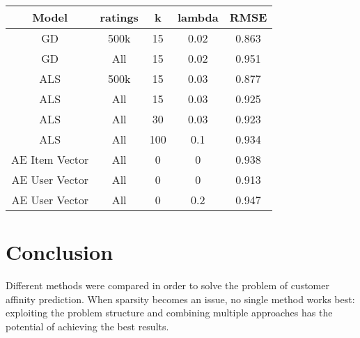 \documentclass[10pt,twocolumn]{article}
\begin{document}
\vspace{0.5cm}

\begin{center}
    \begin{tabular}{|c|c|c|c|c|}
       \hline
       Model & ratings & k & lambda  & RMSE \\
       \hline
       GD  & 500k & 15 & 0.02 & 0.863 \\
	   GD & All & 15 & 0.02 &  0.951 \\
       ALS & 500k & 15 & 0.03 & 0.877 \\
	   ALS & All &  15  &  0.03 & 0.925 \\
       ALS & All & 30 & 0.03 &  0.923 \\
   	   ALS & All &  100  &  0.1 &   0.934 \\
   	   AE Item Vector &  All & 0 & 0 & 0.938 \\
       AE User Vector &  All &  0  &  0 & 0.913 \\
	   AE User Vector &  All &  0  &  0.2 & 0.947 \\

       \hline
    \end{tabular}
  \end{center}




\section{Conclusion}

Different methods were compared in order to solve the problem of customer affinity prediction. When sparsity becomes an issue, no single method works best: exploiting the problem structure and combining multiple approaches has the potential of achieving the best results.


\end{document}
